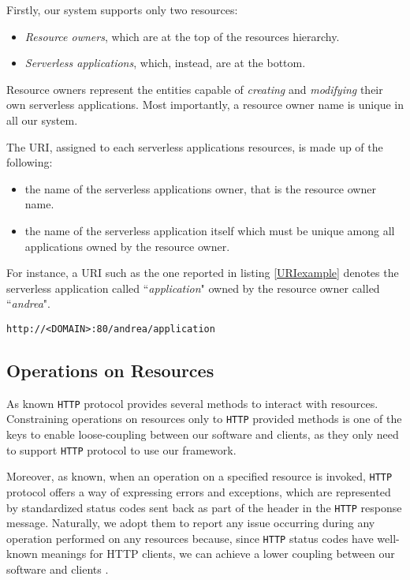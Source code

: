 \documentclass[12pt,a4paper]{report}
\newcommand{\ItalicQuotMark}[1]{``\textit{#1}"}
\begin{document}
Firstly, our system supports only two resources:

\begin{itemize}
	\item \textit{Resource owners}, which are at the top of the resources hierarchy.
	
	\item \textit{Serverless applications}, which, instead, are at the bottom.
\end{itemize}

Resource owners represent the entities capable of \textit{creating} and \textit{modifying} their own serverless applications. Most importantly, a resource owner name is unique in all our system.

The URI, assigned to each serverless applications resources, is made up of the following:

\begin{itemize}
	\item the name of the serverless applications owner, that is the resource owner name.
	\item the name of the serverless application itself which must be unique among all applications owned by the resource owner.
\end{itemize}

For instance, a URI such as the one reported in listing \ref{URIexample} denotes the serverless application called \ItalicQuotMark{application} owned by the resource owner called \ItalicQuotMark{andrea}.

\begin{lstlisting}[frame=lines, caption={A serverless application URI example}, label={URIexample}]
http://<DOMAIN>:80/andrea/application
\end{lstlisting}

\subsection{Operations on Resources}

As known \texttt{HTTP} protocol provides several methods to interact with resources. Constraining operations on resources only to \texttt{HTTP} provided methods is one of the keys to enable loose-coupling between our software and clients, as they only need to support \texttt{HTTP} protocol to use our framework\cite{Guinard}.   

Moreover, as known, when an operation on a specified resource is invoked, \texttt{HTTP} protocol offers a way of expressing errors and exceptions, which are represented by standardized status codes sent back as part of the header in the \texttt{HTTP} response message. Naturally, we adopt them to report any issue occurring during any operation performed on any resources because, since \texttt{HTTP} status codes have well-known meanings for HTTP clients, we can achieve a lower coupling between our software and clients \cite{Guinard}\cite{HTTP}. 
\end{document}
